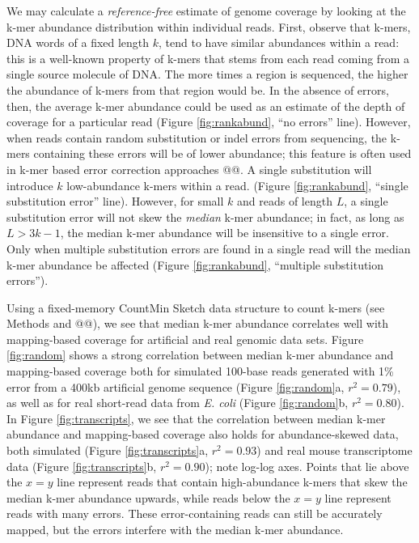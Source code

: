 \documentclass[10pt]{article}
\begin{document}
We may calculate a {\em reference-free} estimate of genome coverage by
looking at the k-mer abundance distribution within individual reads.
First, observe that k-mers, DNA words of a fixed length $k$, tend to
have similar abundances within a read: this is a well-known property
of k-mers that stems from each read coming from a single source
molecule of DNA.  The more times a region is sequenced, the higher the
abundance of k-mers from that region would be.  In the absence of
errors, then, the average k-mer abundance could be used as an estimate
of the depth of coverage for a particular read (Figure
\ref{fig:rankabund}, ``no errors'' line).  However, when reads contain
random substitution or indel errors from sequencing, the k-mers
containing these errors will be of lower abundance; this feature is
often used in k-mer based error correction approaches @@.  A single
substitution will introduce $k$ low-abundance k-mers within a read.
(Figure \ref{fig:rankabund}, ``single substitution error'' line).
However, for small $k$ and reads of length $L$, a single
substitution error will not skew the {\em median} k-mer abundance; in
fact, as long as $L > 3k-1$, the median k-mer abundance will be
insensitive to a single error.  Only when multiple substitution errors
are found in a single read will the median k-mer abundance be affected
(Figure \ref{fig:rankabund}, ``multiple substitution errors'').

Using a fixed-memory CountMin Sketch data structure to count k-mers
(see Methods and @@), we see that median k-mer abundance correlates
well with mapping-based coverage for artificial and real genomic data
sets.  Figure \ref{fig:random} shows a strong correlation between
median k-mer abundance and mapping-based coverage both for simulated
100-base reads generated with 1\% error from a 400kb artificial genome
sequence (Figure \ref{fig:random}a, $r^2 = 0.79$), as well as for real
short-read data from {\em E. coli} (Figure \ref{fig:random}b, $r^2 =
0.80$).  In Figure \ref{fig:transcripts}, we see that the correlation
between median k-mer abundance and mapping-based coverage also holds
for abundance-skewed data, both simulated (Figure
\ref{fig:transcripts}a, $r^2 = 0.93$) and real mouse transcriptome
data (Figure \ref{fig:transcripts}b, $r^2 = 0.90$); note log-log axes.
Points that lie above the $x=y$ line represent reads that contain
high-abundance k-mers that skew the median k-mer abundance upwards,
while reads below the $x=y$ line represent reads with many errors.
These error-containing reads can still be accurately mapped, but the
errors interfere with the median k-mer abundance.
\end{document}
